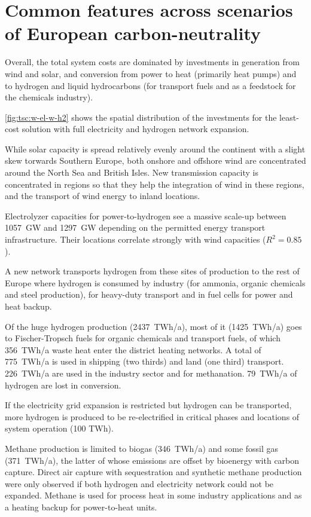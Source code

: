 \section*{Common features across scenarios of European carbon-neutrality}
\label{sec:es}

Overall, the total system costs are dominated by investments in generation from wind
and solar, and conversion from power to heat (primarily heat pumps)
and to hydrogen and liquid hydrocarbons (for transport fuels and as a
feedstock for the chemicals industry).

\cref{fig:tsc:w-el-w-h2} shows the spatial distribution of the investments
for the least-cost solution with full electricity and hydrogen network expansion.

While solar capacity is spread relatively evenly around the continent with a
slight skew torwards Southern Europe, both onshore and offshore wind are
concentrated around the North Sea and British Isles. New transmission capacity
is concentrated in regions so that they help the integration of wind in these
regions, and the transport of wind energy to inland locations.

Electrolyzer capacities for power-to-hydrogen see a massive scale-up between
1057~GW and 1297~GW depending on the permitted energy transport infrastructure.
Their locations correlate strongly with wind capacities ($R^2=0.85$).

A new network transports hydrogen from these sites of production to the rest of
Europe where hydrogen is consumed by industry (for ammonia, organic chemicals
and steel production), for heavy-duty transport and in fuel cells for power and
heat backup.

Of the huge hydrogen production (2437~TWh/a), most of it (1425~TWh/a) goes to
Fischer-Tropsch fuels for organic chemicals and transport fuels, of which
356~TWh/a waste heat enter the district heating networks. A total of 775~TWh/a
is used in shipping (two thirds) and land (one third) transport. 226~TWh/a are
used in the industry sector and for methanation. 79~TWh/a of hydrogen are lost
in conversion.

If the electricity grid expansion is restricted but hydrogen can be transported,
more hydrogen is produced to be re-electrified in critical phases and locations
of system operation (100 TWh\el).

Methane production is limited to biogas (346~TWh/a) and some fossil gas
(371~TWh/a), the latter of whose emissions are offset by bioenergy with carbon
capture. Direct air capture with sequestration and synthetic methane production
were only observed if both hydrogen and electricity network could not be
expanded. Methane is used for process heat in some industry applications and as
a heating backup for power-to-heat units.


